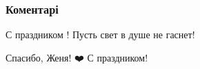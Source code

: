  
 
 
 
 
\subsubsection{Коментарі}

\begin{itemize}
 
С праздником ! Пусть свет в душе не гаснет!

 
Спасибо, Женя! ❤️ С праздником!
\end{itemize}

